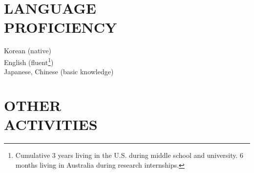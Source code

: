 \documentclass[margin, 10pt]{res} %
\begin{document}
\begin{resume}
\section{LANGUAGE \\ PROFICIENCY} 

Korean (native) \\
English (fluent\footnote{Cumulative 3 years living in the U.S. during middle school and university. 6 months living in Australia during research internships.}) \\
Japanese, Chinese (basic knowledge) \\
 


\section{OTHER \\ ACTIVITIES} 


\end{resume}
\end{document}
